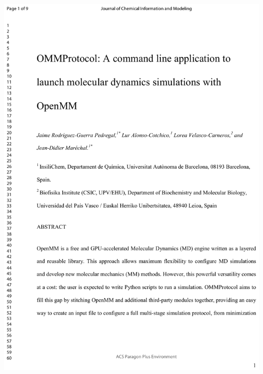 \clearpage\thispagestyle{empty}\mbox{}\clearpage
\includegraphics[width=\textwidth]{figures/pubs/ommprotocol.pdf}
\clearpage\thispagestyle{empty}\mbox{}\clearpage
